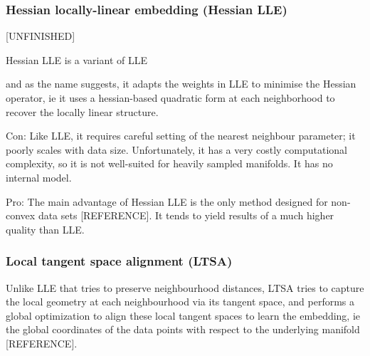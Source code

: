 \documentclass[journal, a4paper]{IEEEtran}
\begin{document}
\hfill
\subsubsection{Hessian locally-linear embedding (Hessian LLE)}
[UNFINISHED]

Hessian LLE is a variant of LLE

and as the name suggests, it adapts the weights in LLE to minimise the Hessian operator, ie it uses a hessian-based quadratic form at each neighborhood to recover the locally linear structure. 

Con: Like LLE, it requires careful setting of the nearest neighbour parameter; it poorly scales with data size.
Unfortunately, it has a very costly computational complexity, so it is not well-suited for heavily sampled manifolds. It has no internal model.

Pro: The main advantage of Hessian LLE is the only method designed for non-convex data sets [REFERENCE].
It tends to yield results of a much higher quality than LLE. 



\hfill
\subsubsection{Local tangent space alignment (LTSA)}

Unlike LLE that tries to preserve neighbourhood distances, LTSA tries to capture the local geometry at each neighbourhood via its tangent space, and performs a global optimization to align these local tangent spaces to learn the embedding, ie the global coordinates of the data points with respect to the underlying manifold [REFERENCE].
\end{document}
